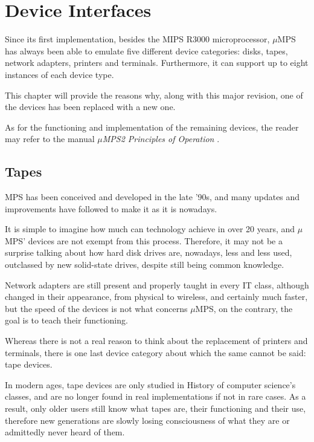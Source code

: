 \documentclass[12pt,a4paper,openright,twoside]{report}
\begin{document}
\chapter{Device Interfaces}
\lhead[\fancyplain{}{\bfseries\thepage}]{\fancyplain{}{\bfseries\rightmark}}
	Since its first implementation, besides the MIPS R3000 microprocessor, $\mu$MPS has always been able to emulate five different device categories: disks, tapes, network adapters, printers and terminals.
	Furthermore, it can support up to eight instances of each device type.

	This chapter will provide the reasons why, along with this major revision, one of the devices has been replaced with a new one.

	As for the functioning and implementation of the remaining devices, the reader may refer to the manual \textit{$\mu$MPS2 Principles of Operation} \cite{pops}.
	
\section{Tapes}
	MPS has been conceived and developed in the late '90s, and many updates and improvements have followed to make it as it is nowadays.

	It is simple to imagine how much can technology achieve in over 20 years, and $\mu$MPS' devices are not exempt from this process.
	Therefore, it may not be a surprise talking about how hard disk drives are, nowadays, less and less used, outclassed by new solid-state drives, despite still being common knowledge.

	Network adapters are still present and properly taught in every IT class, although changed in their appearance, from physical to wireless, and certainly much faster, but the speed of the devices is not what concerns $\mu$MPS, on the contrary, the goal is to teach their functioning.

	Whereas there is not a real reason to think about the replacement of printers and terminals, there is one last device category about which the same cannot be said: tape devices.

	In modern ages, tape devices are only studied in History of computer science's classes, and are no longer found in real implementations if not in rare cases.
	As a result, only older users still know what tapes are, their functioning and their use, therefore new generations are slowly losing consciousness of what they are or admittedly never heard of them.
\end{document}
